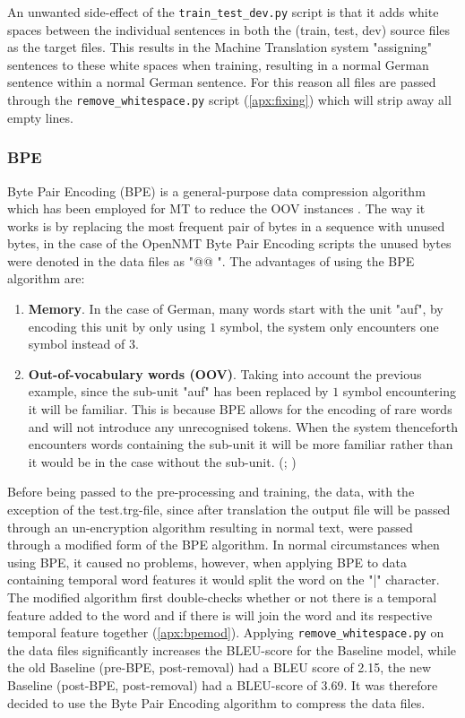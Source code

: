 An unwanted side-effect of the \texttt{train\_test\_dev.py} \cite{dimitarshterionovtrain} script is that it adds white spaces between the individual sentences in both the (train, test, dev) source files as the target files. This results in the Machine Translation system "assigning" sentences to these white spaces when training, resulting in a normal German sentence within a normal German sentence. For this reason all files are passed through the \texttt{remove\_whitespace.py} script (\autoref{apx:fixing}) which will strip away all empty lines. 


\subsubsection{BPE}

Byte Pair Encoding (BPE) is a general-purpose data compression algorithm \cite{gage1994new} which has been employed for MT to reduce the OOV instances \cite{sennrich2015neural}. The way it works is by replacing the most frequent pair of bytes in a sequence with unused bytes, in the case of the OpenNMT Byte Pair Encoding \cite{klein-etal-2017-opennmt} scripts the unused bytes were denoted in the data files as "@@ ". The advantages of using the BPE algorithm are:

\begin{enumerate}
    \item \textbf{Memory}. In the case of German, many words start with the unit "auf", by encoding this unit by only using $1$ symbol, the system only encounters one symbol instead of $3$. \cite{gage1994new}
    \item \textbf{Out-of-vocabulary words (OOV)}. Taking into account the previous example, since the sub-unit "auf" has been replaced by $1$ symbol encountering it will be familiar. This is because BPE allows for the encoding of rare words and will not introduce any unrecognised tokens. When the system thenceforth encounters words containing the sub-unit it will be more familiar rather than it would be in the case without the sub-unit. (\citealp{gage1994new}; \citealp{sennrich2015neural})
\end{enumerate}

Before being passed to the pre-processing and training, the data, with the exception of the test.trg-file, since after translation the output file will be passed through an un-encryption algorithm resulting in normal text, were passed through a modified form of the BPE algorithm.  In normal circumstances when using BPE, it caused no problems, however, when applying BPE to data containing temporal word features it would split the word on the "|" character. The modified algorithm first double-checks whether or not there is a temporal feature added to the word and if there is will join the word and its respective temporal feature together (\autoref{apx:bpemod}). Applying \texttt{remove\_whitespace.py} on the data files significantly increases the BLEU-score for the Baseline model, while the old Baseline (pre-BPE, post-removal) had a BLEU score of 2.15, the new Baseline (post-BPE, post-removal) had a BLEU-score of 3.69. It was therefore decided to use the Byte Pair Encoding algorithm to compress the data files.  


